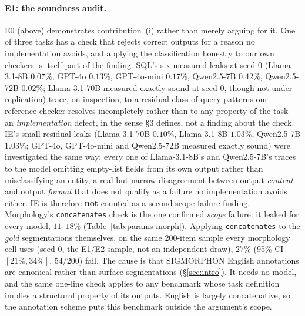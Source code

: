 \documentclass[11pt]{article}
\begin{document}
\paragraph{E1: the soundness audit.} E0 (above) demonstrates contribution~(i)
rather than merely arguing for it. One of three
tasks has a check that rejects correct outputs for a reason no implementation
avoids, and applying the classification honestly to our own checkers is
itself part of the finding. SQL's six measured leaks at seed 0 (Llama-3.1-8B
$0.07\%$, GPT-4o $0.13\%$, GPT-4o-mini $0.17\%$, Qwen2.5-7B $0.42\%$,
Qwen2.5-72B $0.02\%$; Llama-3.1-70B measured
exactly sound at seed 0, though not under replication)
trace, on inspection, to a residual class of query patterns
our reference checker resolves incompletely rather than to any property of
the task -- an \emph{implementation} defect, in the sense \S3 defines, not a
finding about the check. IE's small residual leaks (Llama-3.1-70B $0.10\%$,
Llama-3.1-8B $1.03\%$, Qwen2.5-7B $1.03\%$; GPT-4o, GPT-4o-mini and
Qwen2.5-72B measured
exactly sound) were
investigated the same way: every one of Llama-3.1-8B's and Qwen2.5-7B's traces to the model
omitting empty-list fields from its own output rather than misclassifying
an entity, a real but narrow disagreement between output \emph{content} and
output \emph{format} that does not qualify as a failure no implementation
avoids either. IE is therefore \textbf{not} counted as a second scope-failure
finding. Morphology's \texttt{concatenates} check is the one confirmed
\emph{scope} failure: it leaked for every model, $11$--$18\%$
(Table~\ref{tab:params-morph}). Applying \texttt{concatenates} to the
\emph{gold} segmentations themselves, on the same 200-item sample every
morphology cell uses (seed 0, the E1/E2 sample, not an independent draw), $27\%$ (95\% CI $[21\%,34\%]$, $54/200$) fail. The cause
is that SIGMORPHON English annotations are canonical rather than surface
segmentations (\S\ref{sec:intro}). It needs no model, and the same one-line check applies to any benchmark whose
task definition implies a structural property of its outputs.
English is largely concatenative, so the annotation scheme puts this benchmark
outside the argument's scope.
\end{document}

